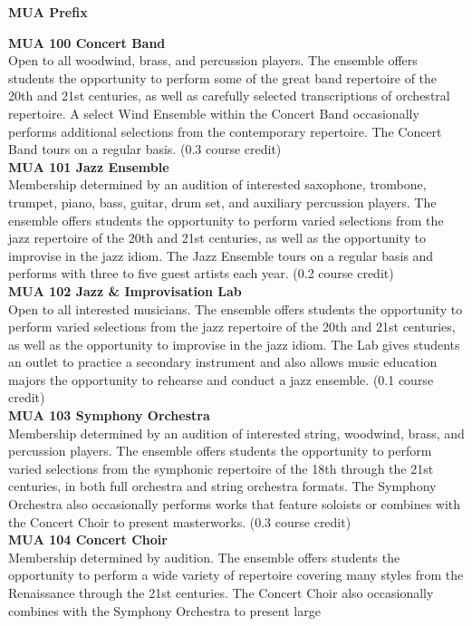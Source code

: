 \documentclass[
  letterpaper,
]{scrbook}
\begin{document}
\textbf{MUA Prefix}

\textbf{MUA 100 Concert Band}\\
Open to all woodwind, brass, and percussion players. The ensemble offers
students the opportunity to perform some of the great band repertoire of
the 20th and 21st centuries, as well as carefully selected
transcriptions of orchestral repertoire. A select Wind Ensemble within
the Concert Band occasionally performs additional selections from the
contemporary repertoire. The Concert Band tours on a regular basis. (0.3
course credit)\\
\textbf{MUA 101 Jazz Ensemble}\\
Membership determined by an audition of interested saxophone, trombone,
trumpet, piano, bass, guitar, drum set, and auxiliary percussion
players. The ensemble offers students the opportunity to perform varied
selections from the jazz repertoire of the 20th and 21st centuries, as
well as the opportunity to improvise in the jazz idiom. The Jazz
Ensemble tours on a regular basis and performs with three to five guest
artists each year. (0.2 course credit)\\
\textbf{MUA 102 Jazz \& Improvisation Lab}\\
Open to all interested musicians. The ensemble offers students the
opportunity to perform varied selections from the jazz repertoire of the
20th and 21st centuries, as well as the opportunity to improvise in the
jazz idiom. The Lab gives students an outlet to practice a secondary
instrument and also allows music education majors the opportunity to
rehearse and conduct a jazz ensemble. (0.1 course credit)\\
\textbf{MUA 103 Symphony Orchestra}\\
Membership determined by an audition of interested string, woodwind,
brass, and percussion players. The ensemble offers students the
opportunity to perform varied selections from the symphonic repertoire
of the 18th through the 21st centuries, in both full orchestra and
string orchestra formats. The Symphony Orchestra also occasionally
performs works that feature soloists or combines with the Concert Choir
to present masterworks. (0.3 course credit)\\
\textbf{MUA 104 Concert Choir}\\
Membership determined by audition. The ensemble offers students the
opportunity to perform a wide variety of repertoire covering many styles
from the Renaissance through the 21st centuries. The Concert Choir also
occasionally combines with the Symphony Orchestra to present large
\end{document}
